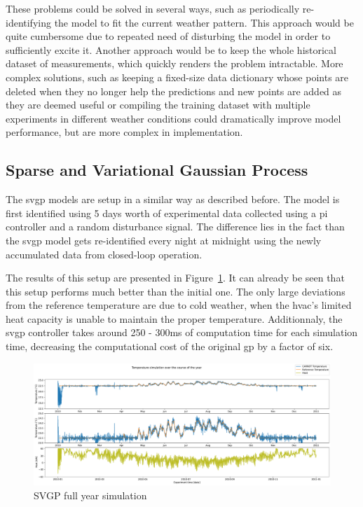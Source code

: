 These problems could be solved in several ways, such as periodically
re-identifying the model to fit the current weather pattern. This approach would
be quite cumbersome due to repeated need of disturbing the model in order to
sufficiently excite it. Another approach would be to keep the whole historical
dataset of measurements, which quickly renders the problem intractable. More
complex solutions, such as keeping a fixed-size data dictionary whose points are
deleted when they no longer help the predictions and new points are added as
they are deemed useful or compiling the training dataset with multiple
experiments in different weather conditions could dramatically improve model
performance, but are more complex in implementation.


\subsection{Sparse and Variational Gaussian Process}\label{sec:SVGP_results}

The \acrlong{svgp} models are setup in a similar way as described before. The
model is first identified using 5 days worth of experimental data collected
using a \acrshort{pi} controller and a random disturbance signal. The difference
lies in the fact than the \acrshort{svgp} model gets re-identified every night
at midnight using the newly accumulated data from closed-loop operation.

The results of this setup are presented in
Figure~\ref{fig:SVGP_fullyear_simulation}. It can already be seen that this
setup performs much better than the initial one. The only large deviations from
the reference temperature are due to cold weather, when the \acrshort{hvac}'s
limited heat capacity is unable to maintain the proper temperature.
Additionnaly, the \acrshort{svgp} controller takes around 250 - 300ms of
computation time for each simulation time, decreasing the computational cost of
the original \acrshort{gp} by a factor of six.



\begin{figure}[ht]
    \centering
    \includegraphics[width =
    \textwidth]{Plots/1_SVGP_480pts_inf_window_12_averageYear_fullyear.pdf}
    \caption{SVGP full year simulation}
    \label{fig:SVGP_fullyear_simulation}
\end{figure}

